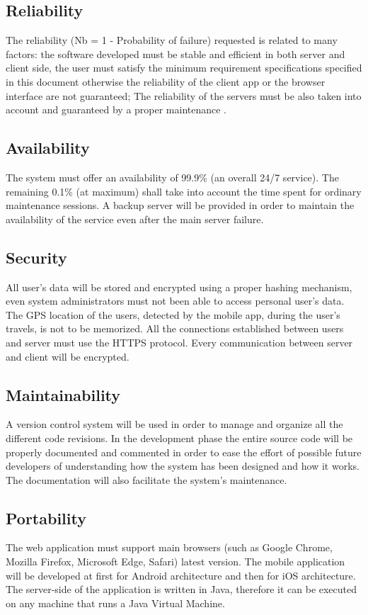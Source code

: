 \subsection{Reliability}
\label{subsect:Reliability}
	The reliability (Nb = 1 - Probability of failure) requested is related to many factors: the software developed must be stable and efficient in both server and client side, the user must satisfy the minimum requirement specifications specified in this document otherwise the reliability of the client app or the browser interface are not guaranteed; The reliability of the servers must be also taken into account and guaranteed by a proper maintenance .

\subsection{Availability}
\label{subsect:Availability}
	The system must offer an availability of 99.9\% (an overall 24/7 service). The remaining 0.1\% (at maximum) shall take into account the time spent for ordinary maintenance sessions. A backup server will be provided in order to maintain the availability of the service even after the main server failure.
\subsection{Security}
\label{subsect:Security}
	All user's data will be stored and encrypted using a proper hashing mechanism, even system administrators must not been able to access personal user's data. The GPS location of the users, detected by the mobile app, during the user's travels, is not to be memorized. All the connections established between users and server must use the
HTTPS protocol. Every communication between server and client will be encrypted.
\subsection{Maintainability}
\label{subsect:Maintainability}
	A version control system will be used in order to manage and organize all the different code revisions. In the development phase the entire source code will be properly documented and commented in order to ease the effort of possible future developers of understanding how the system has been designed and how it works. The documentation will also facilitate the system's maintenance. 
\subsection{Portability}
\label{subsect:Portability}
	The web application must support main browsers (such as Google Chrome, Mozilla Firefox, Microsoft Edge, Safari) latest version.\newline 
	The mobile application will be developed at first for Android architecture and then for iOS architecture.\newline
	The server-side of the application is written in Java, therefore it can be executed on any machine that runs a Java Virtual Machine.